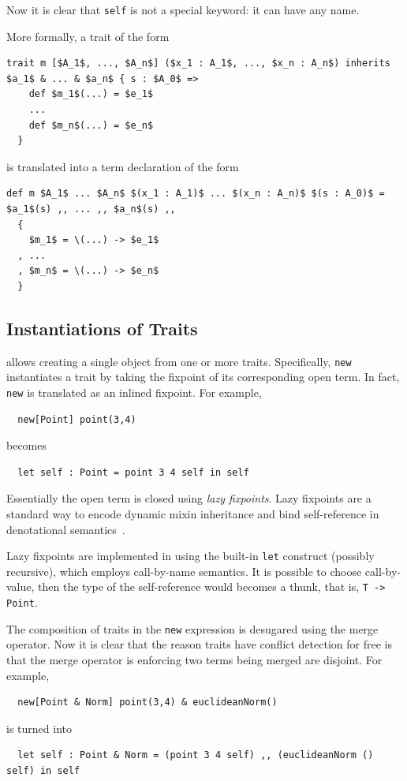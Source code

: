 Now it is clear that \lstinline{self} is not a special keyword: it can
have any name.

More formally, a trait of the form
\begin{lstlisting}[mathescape=true]
  trait m [$A_1$, ..., $A_n$] ($x_1 : A_1$, ..., $x_n : A_n$) inherits $a_1$ & ... & $a_n$ { s : $A_0$ =>
    def $m_1$(...) = $e_1$
    ...
    def $m_n$(...) = $e_n$
  }
\end{lstlisting}
is translated into a term declaration of the form
\begin{lstlisting}[mathescape=true]
  def m $A_1$ ... $A_n$ $(x_1 : A_1)$ ... $(x_n : A_n)$ $(s : A_0)$ = $a_1$(s) ,, ... ,, $a_n$(s) ,,
  {
    $m_1$ = \(...) -> $e_1$
  , ...
  , $m_n$ = \(...) -> $e_n$
  }
\end{lstlisting}


\subsection{Instantiations of Traits}

\name allows creating a single object from one or more traits. Specifically,
\lstinline{new} instantiates a trait by taking the fixpoint of its
corresponding open term. In fact, \lstinline{new} is translated as an inlined
fixpoint. For example,
\begin{lstlisting}
  new[Point] point(3,4)
\end{lstlisting}
becomes
\begin{lstlisting}
  let self : Point = point 3 4 self in self
\end{lstlisting}
Essentially the open term is closed using \textit{lazy fixpoints}. Lazy
fixpoints are a standard way to encode dynamic mixin inheritance and bind
self-reference in denotational semantics~\cite{cook1989denotational}.

Lazy fixpoints are implemented in \name using the built-in \lstinline{let}
construct (possibly recursive), which employs call-by-name semantics. It is
possible to choose call-by-value, then the type of the self-reference would
becomes a thunk, that is, \lstinline$T -> Point$.

The composition of traits in the \lstinline{new} expression is desugared using
the merge operator. Now it is clear that the reason traits have conflict
detection for free is that the merge operator is enforcing two terms being
merged are disjoint. For example,
\begin{lstlisting}
  new[Point & Norm] point(3,4) & euclideanNorm()
\end{lstlisting}
is turned into
\begin{lstlisting}
  let self : Point & Norm = (point 3 4 self) ,, (euclideanNorm () self) in self
\end{lstlisting}

